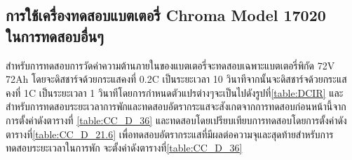 \subsection{การใช้เครื่องทดสอบแบตเตอรี่ Chroma Model 17020 \\ ในการทดสอบอื่นๆ}
สำหรับการทดสอบการวัดค่าความต้านภายในของแบตเตอรี่จะทดสอบเฉพาะแบตเตอรี่พิกัด 72V 72Ah โดยจะดิสชาร์จด้วยกระแสคงที่ 0.2C เป็นระยะเวลา 10 วินาทีจากนั้นจะดิสชาร์จด้วยกระแสคงที่ 
1C เป็นระยะเวลา 1 วินาทีโดยการกำหนดตัวแปรต่างๆจะเป็นไปดังรูปที่\ref{table:DCIR} และสำหรับการทดสอบระยะเวลาการพักและทดสอบอัตรากระแสจะสังเกตจากการทดสอบก่อนหน้านี้จากการตั้งค่าดังตารางที่
\ref{table:CC_D_36} และทดสอบโดยเปรียบเทียบการทดสอบโดยการตั้งค่าดังตารางที่\ref{table:CC_D_21.6} เพื่อทดสอบอัตรากระแสที่มีผลต่อความจุและสุดท้ายสำหรับการทดสอบระยะเวลาในการพัก
จะตั้งค่าดังตารางที่\ref{table:CC_D_36}
\begin{center}


\begin{table}[H]
\centering
\caption{การตั้งค่าสำหรับการทดสอบวัดค่าความต้านทานภายในของแบตเตอรี่ 72V72Ah}
\label{table:DCIR}
\end{table}


\end{center}
